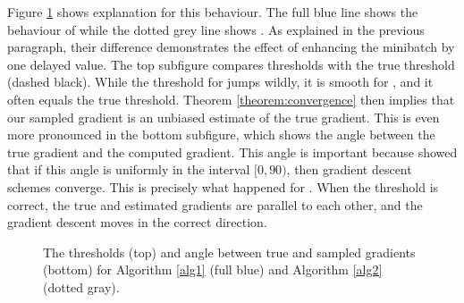 Figure \ref{fig:thresholds2} shows explanation for this behaviour. The full blue line shows the behaviour of \DeepTopPush while the dotted grey line shows \PatMatNP. As explained in the previous paragraph, their difference demonstrates the effect of enhancing the minibatch by one delayed value. The top subfigure compares thresholds with the true threshold (dashed black). While the threshold for \PatMatNP jumps wildly, it is smooth for \DeepTopPush, and it often equals the true threshold. Theorem \ref{theorem:convergence} then implies that our sampled gradient is an unbiased estimate of the true gradient. This is even more pronounced in the bottom subfigure, which shows the angle between the true gradient and the computed gradient. This angle is important because \cite{nocedal2006numerical} showed that if this angle is uniformly in the interval $[0,90)$, then gradient descent schemes converge. This is precisely what happened for \DeepTopPush. When the threshold is correct, the true and estimated gradients are parallel to each other, and the gradient descent moves in the correct direction.

\begin{figure}[!ht]
  \centering
  \caption{The thresholds (top) and angle between true and sampled gradients (bottom) for Algorithm \ref{alg1} (full blue) and Algorithm \ref{alg2} (dotted gray).}
  \label{fig:thresholds2}
\end{figure}

